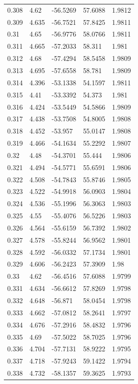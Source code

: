 \begin{tabular}{lllll}
0.308 & 4.62 & -56.5269 & 57.6088 & 1.9812 \\
0.309 & 4.635 & -56.7521 & 57.8425 & 1.9811 \\
0.31 & 4.65 & -56.9776 & 58.0766 & 1.9811 \\
0.311 & 4.665 & -57.2033 & 58.311 & 1.981 \\
0.312 & 4.68 & -57.4294 & 58.5458 & 1.9809 \\
0.313 & 4.695 & -57.6558 & 58.781 & 1.9809 \\
0.314 & 4.396 & -53.1338 & 54.1597 & 1.9811 \\
0.315 & 4.41 & -53.3392 & 54.373 & 1.981 \\
0.316 & 4.424 & -53.5449 & 54.5866 & 1.9809 \\
0.317 & 4.438 & -53.7508 & 54.8005 & 1.9808 \\
0.318 & 4.452 & -53.957 & 55.0147 & 1.9808 \\
0.319 & 4.466 & -54.1634 & 55.2292 & 1.9807 \\
0.32 & 4.48 & -54.3701 & 55.444 & 1.9806 \\
0.321 & 4.494 & -54.5771 & 55.6591 & 1.9806 \\
0.322 & 4.508 & -54.7843 & 55.8746 & 1.9805 \\
0.323 & 4.522 & -54.9918 & 56.0903 & 1.9804 \\
0.324 & 4.536 & -55.1996 & 56.3063 & 1.9803 \\
0.325 & 4.55 & -55.4076 & 56.5226 & 1.9803 \\
0.326 & 4.564 & -55.6159 & 56.7392 & 1.9802 \\
0.327 & 4.578 & -55.8244 & 56.9562 & 1.9801 \\
0.328 & 4.592 & -56.0332 & 57.1734 & 1.9801 \\
0.329 & 4.606 & -56.2423 & 57.3909 & 1.98 \\
0.33 & 4.62 & -56.4516 & 57.6088 & 1.9799 \\
0.331 & 4.634 & -56.6612 & 57.8269 & 1.9798 \\
0.332 & 4.648 & -56.871 & 58.0454 & 1.9798 \\
0.333 & 4.662 & -57.0812 & 58.2641 & 1.9797 \\
0.334 & 4.676 & -57.2916 & 58.4832 & 1.9796 \\
0.335 & 4.69 & -57.5022 & 58.7025 & 1.9796 \\
0.336 & 4.704 & -57.7131 & 58.9222 & 1.9795 \\
0.337 & 4.718 & -57.9243 & 59.1422 & 1.9794 \\
0.338 & 4.732 & -58.1357 & 59.3625 & 1.9793 \\

\end{tabular}
